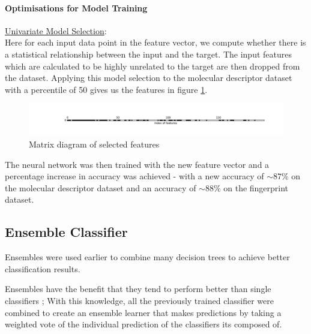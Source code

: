 \documentclass[a4paper,12pt]{report}
\begin{document}
			\paragraph{Optimisations for Model Training} 
			\underline{Univariate Model Selection}: \\
			Here for each input data point in the feature vector, we compute whether there is a statistical relationship between the input and the target. The input features which are calculated to be highly unrelated to the target are then dropped from the dataset. Applying this model selection to the molecular descriptor dataset with a percentile of 50 gives us the features in figure \ref{fig:neuralnetworksmdunivariate}.
				\begin{figure}[h]
					\centering
					\includegraphics[width=\textwidth,scale=1]{images/neural_network_smd_univariate_matrix}
					\caption{Matrix diagram of selected features}
					\label{fig:neuralnetworksmdunivariate}
				\end{figure}
			The neural network was then trained with the new feature vector and a percentage increase in accuracy was achieved - with a new accuracy of $\sim87\%$ on the molecular descriptor dataset and an accuracy of $\sim88\%$ on the fingerprint dataset.
			
			
			
		\subsection{Ensemble Classifier} \label{subsection:ensemble}
		Ensembles were used earlier to combine many decision trees to achieve better classification results. 
		
		Ensembles have the benefit that they tend to perform better than single classifiers \cite{Dietterich}; With this knowledge, all the previously trained classifier were combined to create an ensemble learner that makes predictions by taking a weighted vote of the individual prediction of the classifiers its composed of.
		
\end{document}
